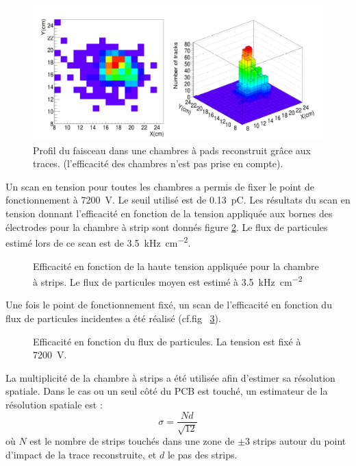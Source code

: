 \begin{figure}[ht!]
	\centering
	\includegraphics[width=0.83\linewidth]{GLA/FaisceauPS.png}
	\caption{Profil du faisceau dans une chambres à pads reconstruit grâce aux traces. (l'efficacité des chambres n'est pas prise en compte).}
	\label{faisceauPS}
\end{figure}

Un scan en tension pour toutes les chambres a permis de fixer le point de fonctionnement à \SI{7200}{\volt}. Le seuil utilisé est de \SI{0.13}{\pico\coulomb}. Les résultats du scan en tension donnant l'efficacité en fonction de la tension appliquée aux bornes des électrodes pour la chambre à strip sont donnés figure \ref{ScanTensionPS}. Le flux de particules estimé lors de ce scan est de \SI{3.5}{\kilo\hertz\per\square\centi\meter}.

\begin{figure}[!ht]
	\centering
	\caption{Efficacité en fonction de la haute tension appliquée pour la chambre à strips. Le flux de particules moyen est estimé à \SI{3.5}{\kilo\hertz\per\square\centi\meter}}
	\label{ScanTensionPS}
\end{figure}

Une fois le point de fonctionnement fixé, un scan de l'efficacité en fonction du flux de particules incidentes a été réalisé (cf.fig~ \ref{ScanRatePS}).

\begin{figure}[!ht]
	\centering
	\caption{Efficacité en fonction du flux de particules. La tension est fixé à \SI{7200}{\volt}.}
	\label{ScanRatePS}
\end{figure}

La multiplicité de la chambre à strips a été utilisée afin d'estimer sa résolution spatiale. Dans le cas ou un seul côté du PCB est touché, un estimateur de la résolution spatiale est :
\begin{equation}
\sigma=\frac{Nd}{\sqrt{12}}
\end{equation}
où $N$ est le nombre de strips touchés dans une zone de $\pm 3$ strips autour du point d’impact de la trace reconstruite, et $d$ le pas des strips.

